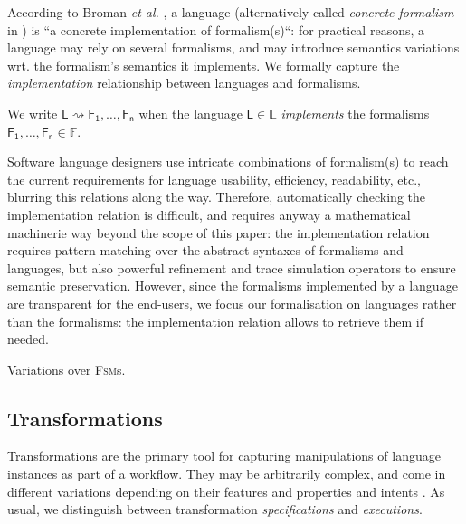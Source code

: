 According to Broman \emph{et al.} \cite{Broman-etAl:2012}, a language 
(alternatively called \emph{concrete formalism} in \cite{P:MPM:2006}) is ``a 
concrete implementation of formalism(s)``: 
for practical reasons, a language may rely on several 
formalisms, and may introduce semantics variations wrt. the formalism's 
semantics it implements. We formally capture the \emph{implementation} 
relationship between languages and formalisms.

\begin{Definition}
   We write $\mathsf{L} \rightsquigarrow \mathsf{F_1}, \ldots, \mathsf{F_n}$ 
when the language $\mathsf{L}\in\mathbb{L}$ \emph{implements} the formalisms 
$\mathsf{F_1}, \ldots, \mathsf{F_n}\in\mathbb{F}$.
\end{Definition}
\noindent
Software language designers use intricate combinations of formalism(s) to reach 
the current requirements for language usability, efficiency, readability, etc., 
blurring this relations along the way. 
Therefore, automatically checking the implementation relation is difficult, and 
requires anyway a mathematical machinerie way beyond the scope of this paper: 
the implementation relation requires pattern matching over the abstract 
syntaxes of formalisms and languages, but also powerful refinement and 
trace simulation operators to ensure semantic preservation. 
However, since the formalisms implemented by a language are transparent for the 
end-users, we focus our formalisation on languages rather than the formalisms: 
the implementation relation allows to retrieve them if needed.

\begin{Example}{Variations over \textsc{Fsm}s.}
   
\end{Example}



\subsection{Transformations}
\label{sec:Formalisation-Transformation}

Transformations are the primary tool for capturing manipulations of language 
instances as part of a workflow. They may be arbitrarily complex, and come in 
different variations depending on their features \cite{J:Mens-VonGorp:2006} and 
properties and intents \cite{J:Lucio-Amrani-etAl:2014}. As usual, we 
distinguish between transformation \emph{specifications} and \emph{executions}.

